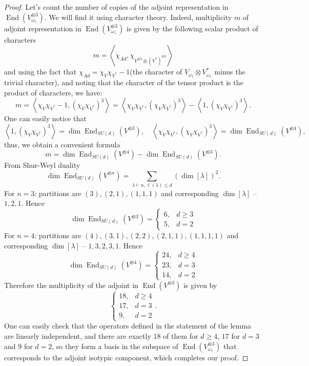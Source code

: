 \documentclass[11pt,letterpaper]{article}
\theoremstyle{plain}
\theoremstyle{plain}
\theoremstyle{plain}
\theoremstyle{plain}
\theoremstyle{plain}
\theoremstyle{plain}
\theoremstyle{plain}
\theoremstyle{definition}
\theoremstyle{plain}
\begin{document}
\begin{proof}
    Let's count the number of copies of the adjoint representation in $\operatorname{End}(V_{\omega_1}^{\otimes 3})$. We will 
    find it using character theory. Indeed, multiplicity $m$ of adjoint representation in $\operatorname{End}(V_{\omega_1}^{\otimes 3})$ is given by the following scalar product of characters
    \[
        m=\left\langle\chi_{A d}, \chi_{V^{\otimes 3} \otimes\left(V^*\right)^{\otimes 3}}\right\rangle
    \]
    and using the fact that $\chi_{Ad}=\chi_V \chi_{V^*}-1$(the character of $V_{\omega_1} \otimes V_{\omega_1}^*$ minus the trivial character), and noting that the character of the tensor product is the product of characters, we have:
    \[
        m=\left\langle\chi_V \chi_{V^*}-1,\left(\chi_V \chi_{V^*}\right)^3\right\rangle=\left\langle \chi_V \chi_{V^*},\left(\chi_V \chi_{V^*}\right)^3\right\rangle-\left\langle 1, \left(\chi_V \chi_{V^*}\right)^3\right\rangle.
    \]
    One can easily notice that
    \[
        \left\langle 1, \left(\chi_V \chi_{V^*}\right)^3\right\rangle=\operatorname{dim} \operatorname{End}_{S U(d)}\left(V^{\otimes 3}\right), \quad \left\langle \chi_V \chi_{V^*},\left(\chi_V \chi_{V^*}\right)^3\right\rangle=\operatorname{dim} \operatorname{End}_{S U(d)}\left(V^{\otimes 4}\right),
    \]
    thus, we obtain a convenient formula 
    \[
        m=\operatorname{dim} \operatorname{End}_{S U(d)}\left(V^{\otimes 4}\right)-\operatorname{dim} \operatorname{End}_{S U(d)}\left(V^{\otimes 3}\right).
    \]
    From Shur-Weyl duality
    \[
        \operatorname{dim} \operatorname{End}_{S U(d)}\left(V^{\otimes n}\right)=\sum_{\lambda \vdash n, \ell(\lambda) \leq d}\left(\operatorname{dim}[\lambda]\right)^2.
    \]
    For $n=3$: partitions are $(3),(2,1),(1,1,1)$ and corresponding $\operatorname{dim}[\lambda]$ -- $1,2,1$.
    Hence
    $$
    \operatorname{dim} \operatorname{End}_{S U(d)}\left(V^{\otimes 3}\right)= \begin{cases}6, & d \geq 3 \\ 5, & d=2\end{cases}
    $$
    For $n=4$: partitions are $(4),(3,1),(2,2),(2,1,1),(1,1,1,1)$ and corresponding $\operatorname{dim}[\lambda]$ -- $1,3,2,3,1$.
    Hence
    $$
    \operatorname{dim} \operatorname{End}_{S U(d)}\left(V^{\otimes 4}\right)= \begin{cases}24, & d \geq 4 \\ 23, & d=3 \\ 14, & d=2\end{cases}
    $$
    Therefore the multiplicity of the adjoint in $\operatorname{End}\left(V^{\otimes 3}\right)$ is given by
    \[
        \begin{cases}18, & d \geq 4 \\ 17, & d=3 \\ 9, & d=2\end{cases}.
    \]
    One can easily check that the operators defined in the statement of the lemma are linearly independent, and there are exactly $18$ of them for $d \geq 4$, $17$ for $d=3$ and $9$ for $d=2$, 
    so they form a basis in the subspace of $\operatorname{End}(V_{\omega_1}^{\otimes 3})$ that corresponds to the adjoint isotypic component, which completes our proof.
\end{proof}
\end{document}
